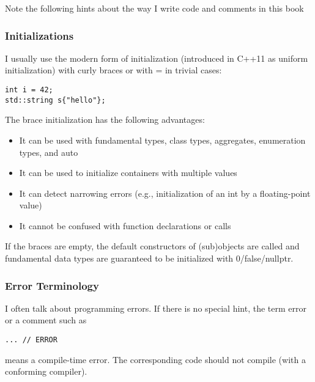 
Note the following hints about the way I write code and comments in this book

\subsubsection*{ Initializations}

I usually use the modern form of initialization (introduced in C++11 as uniform initialization) with curly braces or with = in trivial cases:

\begin{lstlisting}[style=styleCXX]
int i = 42;
std::string s{"hello"};
\end{lstlisting}

The brace initialization has the following advantages:

\begin{itemize}
\item
It can be used with fundamental types, class types, aggregates, enumeration types, and auto

\item
It can be used to initialize containers with multiple values

\item
It can detect narrowing errors (e.g., initialization of an int by a floating-point value)

\item
It cannot be confused with function declarations or calls
\end{itemize}

If the braces are empty, the default constructors of (sub)objects are called and fundamental data types are guaranteed to be initialized with 0/false/nullptr.


\subsubsection*{ Error Terminology}

I often talk about programming errors. If there is no special hint, the term error or a comment such as

\begin{lstlisting}[style=styleCXX]
... // ERROR
\end{lstlisting}

means a compile-time error. The corresponding code should not compile (with a conforming compiler).

